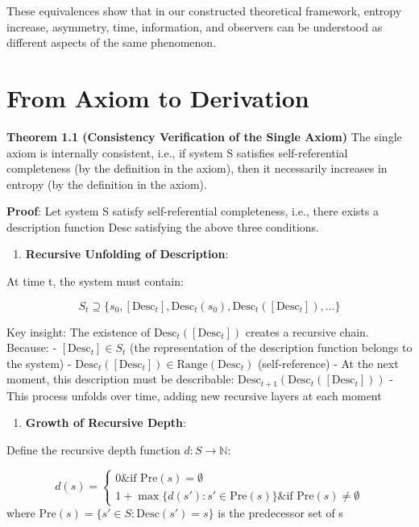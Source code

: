 These equivalences show that in our constructed theoretical framework, entropy increase, asymmetry, time, information, and observers can be understood as different aspects of the same phenomenon.

\section{From Axiom to Derivation}
\label{sec:ch01_axiom_and_derivation:from-axiom-to-derivation}

\textbf{Theorem 1.1 (Consistency Verification of the Single Axiom)}
\label{thm:1.1}
The single axiom is internally consistent, i.e., if system S satisfies self-referential completeness (by the definition in the axiom), then it necessarily increases in entropy (by the definition in the axiom).

\textbf{Proof}:
Let system S satisfy self-referential completeness, i.e., there exists a description function Desc satisfying the above three conditions.

\begin{enumerate}
\item \textbf{Recursive Unfolding of Description}:
\end{enumerate}
  At time t, the system must contain:
  
\begin{equation}
S_t \supseteq \{s_0, [\text{Desc}_t], \text{Desc}_t(s_0), \text{Desc}_t([\text{Desc}_t]), ...\}
\end{equation}

  Key insight: The existence of $\text{Desc}_t([\text{Desc}_t])$ creates a recursive chain. Because:
  - $[\text{Desc}_t] \in S_t$ (the representation of the description function belongs to the system)
  - $\text{Desc}_t([\text{Desc}_t]) \in \text{Range}(\text{Desc}_t)$ (self-reference)
  - At the next moment, this description must be describable: $\text{Desc}_{t+1}(\text{Desc}_t([\text{Desc}_t]))$
  - This process unfolds over time, adding new recursive layers at each moment

\begin{enumerate}
\item \textbf{Growth of Recursive Depth}:
\end{enumerate}
  Define the recursive depth function $d: S \to \mathbb{N}$:
  
\begin{equation}
d(s) = \begin{cases}
0 \& \text{if } \text{Pre}(s) = \emptyset \\
1 + \max\{d(s'): s' \in \text{Pre}(s)\} \& \text{if } \text{Pre}(s) \neq \emptyset
\end{cases}
\end{equation}
  where $\text{Pre}(s) = \{s' \in S: \text{Desc}(s') = s\}$ is the predecessor set of s
  

